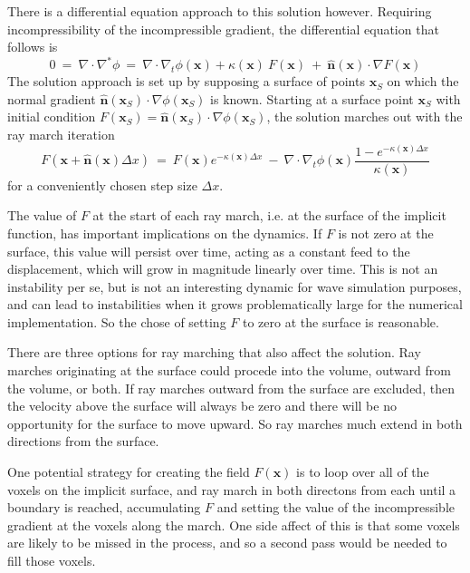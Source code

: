 \documentclass{article}
\def\xvec{\textbf{x}}
\def\nhat{\hat{\textbf{n}}}
\def\dx{\Delta x}
\def\inabla{\nabla^{*}}
\def\dx{\Delta x}
\begin{document}
There is a differential equation approach to this solution however.  Requiring incompressibility of the incompressible gradient, the differential equation that follows is
\begin{equation}
0 \ =\ \nabla\cdot\inabla\phi \ =\ \nabla\cdot\nabla_t\phi(\xvec) + \kappa(\xvec)\ F(\xvec) \ +\ \nhat(\xvec)\cdot\nabla F(\xvec)
\end{equation}
The solution approach is set up by supposing a surface of points $\xvec_S$ on which the normal gradient $\nhat(\xvec_S)\cdot\nabla\phi(\xvec_S)$ is known.  
Starting at a surface point $\xvec_S$ with initial condition $F(\xvec_S)=\nhat(\xvec_S)\cdot\nabla\phi(\xvec_S)$, the solution marches out with the ray march iteration
\begin{equation}
F(\xvec + \nhat(\xvec)\dx) \ =\ F(\xvec)e^{-\kappa(\xvec)\dx}\ -\ \nabla\cdot\nabla_t\phi(\xvec) \frac{1-e^{-\kappa(\xvec)\dx}}{\kappa(\xvec)}
\end{equation}
for a conveniently chosen step size $\dx$.

The value of $F$ at the start of each ray march, i.e. at the surface of the implicit function, has important implications on the dynamics.  If $F$ is not zero at the surface, this value will persist over time, acting as a constant feed to the displacement, which will grow in magnitude linearly over time.  This is not an instability per se, but is not an interesting dynamic for wave simulation purposes, and can lead to instabilities when it grows problematically large for the numerical implementation. So the chose of setting $F$ to zero at the surface is reasonable. 

There are three options for ray marching that also affect the solution.  Ray marches originating at the surface could procede into the volume, outward from the volume, or both. If ray marches outward from the surface are excluded, then the velocity above the surface will always be zero and there will be no opportunity for the surface to move upward.  So ray marches much extend in both directions from the surface. 

One potential strategy for creating the field $F(\xvec)$ is to loop over all of the voxels on the implicit surface, and ray march in both directons  from each until a boundary is reached, accumulating $F$ and setting the value of the incompressible gradient at the voxels along the march.  One side affect of this is that some voxels are likely to be missed in the process, and so a second pass would be needed to fill those voxels.  
\end{document}

